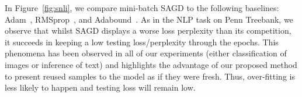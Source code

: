 In Figure~\ref{fig:snli}, we compare mini-batch SAGD to the following baselines: Adam~\citep{kiba15},  RMSprop~\citep{tige12}, and Adabound~\citep{luxi2019}. 
As in the NLP task on Penn Treebank, we observe that whilst SAGD displays a worse loss perplexity than its competition, it succeeds in keeping a low testing loss/perplexity through the epochs.
This phenomena has been observed in all of our experiments (either classification of images or inference of text) and highlights the advantage of our proposed method to present reused samples to the model as if they were fresh. 
Thus, over-fitting is less likely to happen and testing loss will remain low.